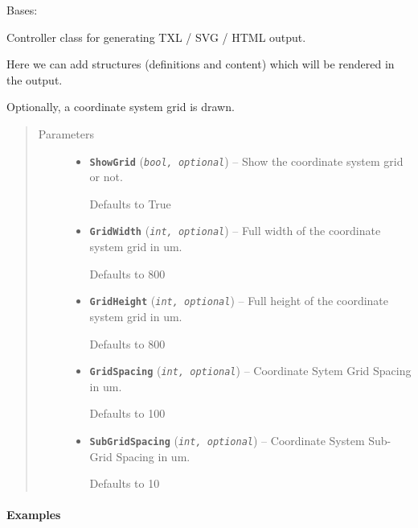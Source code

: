 \documentclass[letterpaper,10pt,english]{sphinxmanual}
\begin{document}

\begin{fulllineitems}
\label{Chapters/PythonModuleReference/TXLWriter/TXLWizard.TXLWriter:TXLWizard.TXLWriter.TXLWriter}
Bases: 

Controller class for generating TXL / SVG / HTML output.

Here we can add structures (definitions and content) which will be rendered in the output.

Optionally, a coordinate system grid is drawn.
\begin{quote}\begin{description}
\item[{Parameters}] \leavevmode\begin{itemize}
\item {} 
\textbf{\texttt{ShowGrid}} (\emph{\texttt{bool, optional}}) -- 
Show the coordinate system grid or not.

Defaults to True


\item {} 
\textbf{\texttt{GridWidth}} (\emph{\texttt{int, optional}}) -- 
Full width of the coordinate system grid in um.

Defaults to 800


\item {} 
\textbf{\texttt{GridHeight}} (\emph{\texttt{int, optional}}) -- 
Full height of the coordinate system grid in um.

Defaults to 800


\item {} 
\textbf{\texttt{GridSpacing}} (\emph{\texttt{int, optional}}) -- 
Coordinate Sytem Grid Spacing in um.

Defaults to 100


\item {} 
\textbf{\texttt{SubGridSpacing}} (\emph{\texttt{int, optional}}) -- 
Coordinate System Sub-Grid Spacing in um.

Defaults to 10


\end{itemize}

\end{description}\end{quote}
\paragraph{Examples}


\end{fulllineitems}
\end{document}
